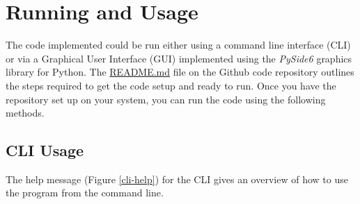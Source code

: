 \documentclass{article}
\begin{document}
\pagebreak

\section{Running and Usage}

The code implemented could be run either using a command line interface (CLI) or via a Graphical User Interface (GUI) implemented using the \textit{PySide6}\cite{noauthor_qt_nodate} graphics library for Python.
The \href{https://github.com/Tiernan8r/quantum_computing_project/blob/master/README.md}{README.md} file on the Github code repository outlines the steps required to get the code setup and ready to run.
Once you have the repository set up on your system, you can run the code using the following methods.

\subsection{CLI Usage}

The help message (Figure \ref{cli-help}) for the CLI gives an overview of how to use the program from the command line.
\end{document}
